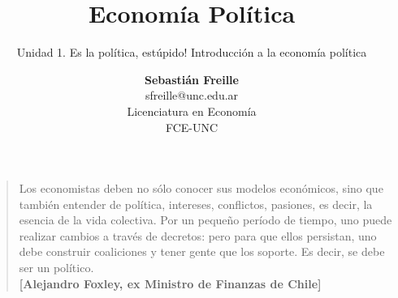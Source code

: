 \documentclass[
  ignorenonframetext,
]{beamer}
\title{Economía Política}
\subtitle{Unidad 1. Es la política, estúpido! Introducción a la economía
política}
\author{\textbf{Sebastián Freille}\\
sfreille@unc.edu.ar\\
Licenciatura en Economía\\
FCE-UNC}
\date{}
\begin{document}
\frame{\titlepage}
\ifdefined\Shaded\renewenvironment{Shaded}{\begin{tcolorbox}[sharp corners, enhanced, boxrule=0pt, breakable, borderline west={3pt}{0pt}{shadecolor}, frame hidden, interior hidden]}{\end{tcolorbox}}\fi

\begin{frame}
\begin{quote}
Los economistas deben no sólo conocer sus modelos económicos, sino que
también entender de política, intereses, conflictos, pasiones, es decir,
la esencia de la vida colectiva. Por un pequeño período de tiempo, uno
puede realizar cambios a través de decretos: pero para que ellos
persistan, uno debe construir coaliciones y tener gente que los soporte.
Es decir, se debe ser un político.\\
\textbf{{[}Alejandro Foxley, ex Ministro de Finanzas de Chile{]}}
\end{quote}
\end{frame}
\end{document}

